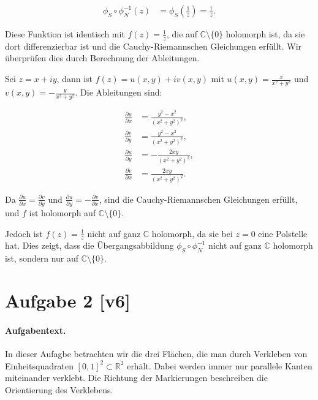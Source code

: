 \documentclass[11pt,a4paper]{article}
\begin{document}
\begin{align*}
\phi_S \circ \phi_N^{-1}(z) &= \phi_S\left(\frac{1}{z}\right) = \frac{1}{z}.
\end{align*}

Diese Funktion ist identisch mit $f(z) = \frac{1}{z}$, die auf $\mathbb{C} \setminus \{0\}$ holomorph ist, da sie dort differenzierbar ist und die Cauchy-Riemannschen Gleichungen erfüllt. Wir überprüfen dies durch Berechnung der Ableitungen.

Sei $z = x + iy$, dann ist $f(z) = u(x, y) + iv(x, y)$ mit $u(x, y) = \frac{x}{x^2 + y^2}$ und $v(x, y) = -\frac{y}{x^2 + y^2}$. Die Ableitungen sind:

\begin{align*}
\frac{\partial u}{\partial x} &= \frac{y^2 - x^2}{(x^2 + y^2)^2}, \\
\frac{\partial v}{\partial y} &= \frac{y^2 - x^2}{(x^2 + y^2)^2}, \\
\frac{\partial u}{\partial y} &= -\frac{2xy}{(x^2 + y^2)^2}, \\
\frac{\partial v}{\partial x} &= \frac{2xy}{(x^2 + y^2)^2}.
\end{align*}

Da $\frac{\partial u}{\partial x} = \frac{\partial v}{\partial y}$ und $\frac{\partial u}{\partial y} = -\frac{\partial v}{\partial x}$, sind die Cauchy-Riemannschen Gleichungen erfüllt, und $f$ ist holomorph auf $\mathbb{C} \setminus \{0\}$.

Jedoch ist $f(z) = \frac{1}{z}$ nicht auf ganz $\mathbb{C}$ holomorph, da sie bei $z=0$ eine Polstelle hat. Dies zeigt, dass die Übergangsabbildung $\phi_S \circ \phi_N^{-1}$ nicht auf ganz $\mathbb{C}$ holomorph ist, sondern nur auf $\mathbb{C} \setminus \{0\}$.


\section*{Aufgabe 2 [v6]}
\paragraph{Aufgabentext.}
In dieser Aufagbe betrachten wir die drei Flächen, die man durch Verkleben von Einheitsquadraten $[0,1]^2 \subset \mathbb{R}^2$ erhält. Dabei werden immer nur parallele Kanten miteinander verklebt. Die Richtung der Markierungen beschreiben die Orientierung des Verklebens.
\end{document}
